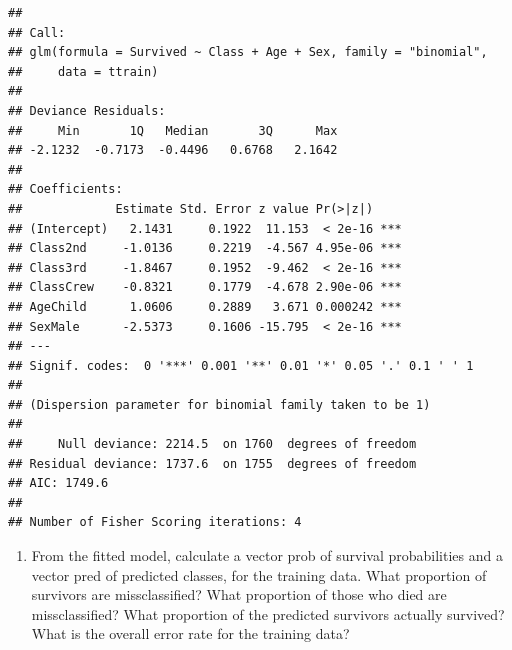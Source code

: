 \documentclass[]{article}
\newenvironment{Shaded}{\begin{snugshade}}{\end{snugshade}}
\newcommand{\CommentTok}[1]{\textcolor[rgb]{0.56,0.35,0.01}{\textit{#1}}}
\newcommand{\DataTypeTok}[1]{\textcolor[rgb]{0.13,0.29,0.53}{#1}}
\newcommand{\FloatTok}[1]{\textcolor[rgb]{0.00,0.00,0.81}{#1}}
\newcommand{\KeywordTok}[1]{\textcolor[rgb]{0.13,0.29,0.53}{\textbf{#1}}}
\newcommand{\NormalTok}[1]{#1}
\newcommand{\OperatorTok}[1]{\textcolor[rgb]{0.81,0.36,0.00}{\textbf{#1}}}
\newcommand{\StringTok}[1]{\textcolor[rgb]{0.31,0.60,0.02}{#1}}
\providecommand{\tightlist}{%
  \setlength{\itemsep}{0pt}\setlength{\parskip}{0pt}}
\begin{document}
\begin{verbatim}
## 
## Call:
## glm(formula = Survived ~ Class + Age + Sex, family = "binomial", 
##     data = ttrain)
## 
## Deviance Residuals: 
##     Min       1Q   Median       3Q      Max  
## -2.1232  -0.7173  -0.4496   0.6768   2.1642  
## 
## Coefficients:
##             Estimate Std. Error z value Pr(>|z|)    
## (Intercept)   2.1431     0.1922  11.153  < 2e-16 ***
## Class2nd     -1.0136     0.2219  -4.567 4.95e-06 ***
## Class3rd     -1.8467     0.1952  -9.462  < 2e-16 ***
## ClassCrew    -0.8321     0.1779  -4.678 2.90e-06 ***
## AgeChild      1.0606     0.2889   3.671 0.000242 ***
## SexMale      -2.5373     0.1606 -15.795  < 2e-16 ***
## ---
## Signif. codes:  0 '***' 0.001 '**' 0.01 '*' 0.05 '.' 0.1 ' ' 1
## 
## (Dispersion parameter for binomial family taken to be 1)
## 
##     Null deviance: 2214.5  on 1760  degrees of freedom
## Residual deviance: 1737.6  on 1755  degrees of freedom
## AIC: 1749.6
## 
## Number of Fisher Scoring iterations: 4
\end{verbatim}

\begin{enumerate}
\def\labelenumi{(\alph{enumi})}
\setcounter{enumi}{1}
\tightlist
\item
  From the fitted model, calculate a vector prob of survival
  probabilities and a vector pred of predicted classes, for the training
  data. What proportion of survivors are missclassified? What proportion
  of those who died are missclassified? What proportion of the predicted
  survivors actually survived? What is the overall error rate for the
  training data?
\end{enumerate}

\begin{Shaded}
\end{Shaded}
\end{document}
